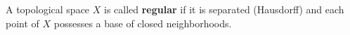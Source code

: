 A topological space $X$ is called \textbf{regular} if it is separated (Hausdorff) and each point of $X$ possesses a base of closed neighborhoods.
